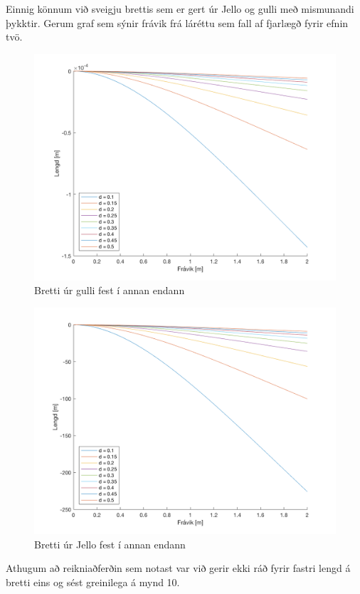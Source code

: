 \documentclass[11pt]{article}
\begin{document}
{Einnig könnum við sveigju brettis sem er gert úr Jello{\texttrademark} og gulli með mismunandi þykktir. Gerum graf sem sýnir frávik frá láréttu sem fall af fjarlægð fyrir efnin tvö.
\begin{figure}[H]
\centering
\includegraphics[scale=0.3]{gullstick.png}
\caption{Bretti úr gulli fest í annan endann}
\end{figure}
\begin{figure}[H]
\centering
\includegraphics[scale=0.3]{jello.png}
\caption{Bretti úr Jello{\texttrademark} fest í annan endann}
\end{figure}
Athugum að reikniaðferðin sem notast var við gerir ekki ráð fyrir fastri lengd á bretti eins og sést greinilega á mynd 10.










}
\end{document}
